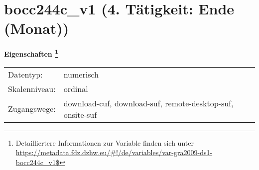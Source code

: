 
    \setcounter{footnote}{0}

    \vspace*{-1.8cm}
	\section{bocc244c\_v1 (4. Tätigkeit: Ende (Monat))}
	\label{section:bocc244c_v1}



    \vspace*{0.5cm}
    \noindent\textbf{Eigenschaften
	\footnote{Detailliertere Informationen zur Variable finden sich unter
		\url{https://metadata.fdz.dzhw.eu/\#!/de/variables/var-gra2009-ds1-bocc244c_v1$}}}\\
	\begin{tabularx}{\hsize}{@{}lX}
	Datentyp: & numerisch \\
	Skalenniveau: & ordinal \\
	Zugangswege: &
	  download-cuf, 
	  download-suf, 
	  remote-desktop-suf, 
	  onsite-suf
 \\
    \end{tabularx}



